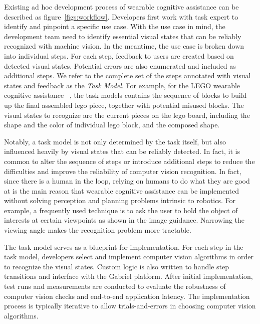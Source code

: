Existing ad hoc development process of wearable cognitive assistance can be
described as figure~\ref{figs:workflow}. Developers first work with task expert
to identify and pinpoint a specific use case. With the use case in mind, the
development team need to identify essential visual states that can be reliably
recognized with machine vision. In the meantime, the use case is broken down
into individual steps. For each step, feedback to users are created based on
detected visual states. Potential errors are also enumerated and included as
additional steps. We refer to the complete set of the steps annotated with
visual states and feedback as the \textit{Task Model}. For example, for the LEGO
wearable cognitive assistance ~\cite{chen2017empirical}, the task models
contains the sequence of blocks to build up the final assembled lego piece,
together with potential misused blocks. The visual states to recognize are the
current pieces on the lego board, including the shape and the color of
individual lego block, and the composed shape.

Notably, a task model is not only determined by the task itself, but also
influenced heavily by visual states that can be reliably detected. In fact, it
is common to alter the sequence of steps or introduce additional steps to reduce
the difficulties and improve the reliability of computer vision recognition. In
fact, since there is a human in the loop, relying on humans to do what they are
good at is the main reason that wearable cognitive assistance can be implemented
without solving perception and planning problems intrinsic to robotics. For
example, a frequently used technique is to ask the user to hold the object of
interests at certain viewpoints as shown in the image guidance. Narrowing the
viewing angle makes the recognition problem more tractable.

The task model serves as a blueprint for implementation. For each step in the
task model, developers select and implement computer vision algorithms in order
to recognize the visual states. Custom logic is also written to handle step
transitions and interface with the Gabriel platform. After initial
implementation, test runs and measurements are conducted to evaluate the
robustness of computer vision checks and end-to-end application latency. The
implementation process is typically iterative to allow trials-and-errors in
choosing computer vision algorithms.

